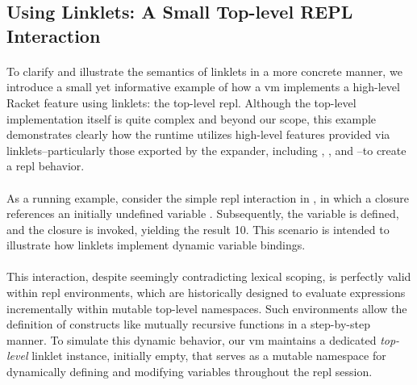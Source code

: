 		\subsection{Using Linklets: A Small Top-level REPL Interaction}
		\label{subsec:toplevel-example}

		\paragraph{}%
			To clarify and illustrate the semantics of linklets in a more concrete manner, we introduce a small yet informative example of how a \gls{vm} implements a high-level Racket feature using linklets: the top-level \gls{repl}. Although the top-level implementation itself is quite complex and beyond our scope, this example demonstrates clearly how the runtime utilizes high-level features provided via linklets--particularly those exported by the expander, including , , and --to create a \gls{repl} behavior.

		\paragraph{}%
			As a running example, consider the simple \gls{repl} interaction in , in which a closure  references an initially undefined variable . Subsequently, the variable  is defined, and the closure is invoked, yielding the result 10. This scenario is intended to illustrate how linklets implement dynamic variable bindings.


		\paragraph{}%
			This interaction, despite seemingly contradicting lexical scoping, is perfectly valid within \gls{repl} environments, which are historically designed to evaluate expressions incrementally within mutable top-level namespaces. Such environments allow the definition of constructs like mutually recursive functions in a step-by-step manner. To simulate this dynamic behavior, our \gls{vm} maintains a dedicated \emph{top-level} linklet instance, initially empty, that serves as a mutable namespace for dynamically defining and modifying variables throughout the \gls{repl} session.

